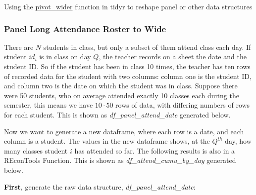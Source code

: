 \documentclass[
]{book}
\begin{document}
Using the \href{https://tidyr.tidyverse.org/reference/pivot_wider.html}{pivot\_wider} function in tidyr to reshape panel or other data structures

\hypertarget{panel-long-attendance-roster-to-wide}{%
\subsubsection{Panel Long Attendance Roster to Wide}\label{panel-long-attendance-roster-to-wide}}

There are \(N\) students in class, but only a subset of them attend class each day. If student \(id_i\) is in class on day \(Q\), the teacher records on a sheet the date and the student ID. So if the student has been in class 10 times, the teacher has ten rows of recorded data for the student with two columns: column one is the student ID, and column two is the date on which the student was in class. Suppose there were 50 students, who on average attended exactly 10 classes each during the semester, this means we have \(10 \cdot 50\) rows of data, with differing numbers of rows for each student. This is shown as \emph{df\_panel\_attend\_date} generated below.

Now we want to generate a new dataframe, where each row is a date, and each column is a student. The values in the new dataframe shows, at the \(Q^{th}\) day, how many classes student \(i\) has attended so far. The following results is also in a REconTools Function. This is shown as \emph{df\_attend\_cumu\_by\_day} generated below.

\textbf{First}, generate the raw data structure, \emph{df\_panel\_attend\_date}:
\end{document}
